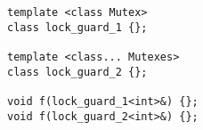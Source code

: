 \begin{lstlisting}[title=\href{https://godbolt.org/z/rvWx8K}{\texttt{godbolt.org/z/rvWx8K}}]
template <class Mutex>
class lock_guard_1 {};

template <class... Mutexes>
class lock_guard_2 {};

void f(lock_guard_1<int>&) {};
void f(lock_guard_2<int>&) {};
\end{lstlisting}
